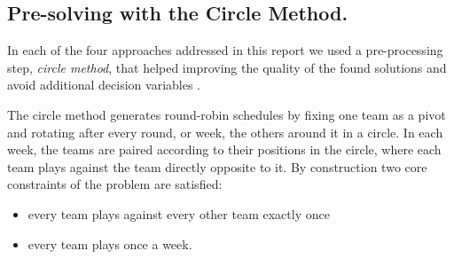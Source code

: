 \subsection{Pre-solving with the Circle Method.}
\label{CircleMatching}
In each of the four approaches addressed in this report we used a pre-processing step, \emph{circle method}, that helped improving the quality of the found solutions and avoid additional decision variables  \cite{dewerra1999}.

The circle method generates round-robin schedules by fixing one team as a pivot and rotating after every round, or week, the others around it in a circle. In each week, the teams are paired according to their positions in the circle, where each team plays against the team directly opposite to it. By construction two core constraints of the problem are satisfied:
\begin{itemize}
    \item every team plays against every other team exactly once
    \item every team plays once a week.
\end{itemize}

